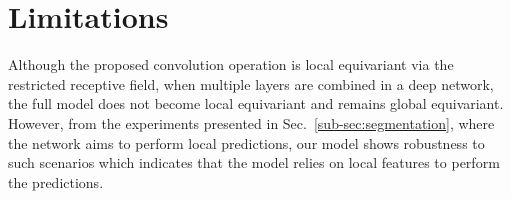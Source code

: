 
\section{Limitations}
\label{sec:limitations}

Although the proposed convolution operation is local equivariant via the restricted receptive field, when multiple layers are combined in a deep network, the full model does not become local equivariant and remains global equivariant.
However, from the experiments presented in Sec.~\ref{sub-sec:segmentation}, where the network aims to perform local predictions, our model shows robustness to such scenarios which indicates that the model relies on local features to perform the predictions. 